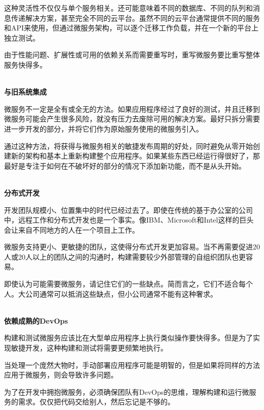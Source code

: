 这种灵活性不仅仅与单个服务相关。还可能意味着不同的数据库、不同的队列和消息传递解决方案，甚至完全不同的云平台。虽然不同的云平台通常提供不同的服务和API来使用，但通过微服务架构，可以逐个迁移工作负载，并在一个新的平台上独立测试。

由于性能问题、扩展性或可用的依赖关系而需要重写时，重写微服务要比重写整体服务快得多。

\hspace*{\fill} \\ %
\noindent
\textbf{与旧系统集成}

微服务不一定是全有或全无的方法。如果应用程序经过了良好的测试，并且迁移到微服务可能会产生很多风险，就没有压力去废除可用的解决方案。最好只拆分需要进一步开发的部分，并将它们作为原始服务使用的微服务引入。

通过这种方法，将获得与微服务相关的敏捷发布周期的好处，同时避免从零开始创建新的架构和基本上重新构建整个应用程序。如果某些东西已经运行得很好了，那最好是专注于如何在不破坏好的部分的情况下添加新功能，而不是从头开始。

\hspace*{\fill} \\ %
\noindent
\textbf{分布式开发}

开发团队规模小、位置集中的时代已经过去了。即使在传统的基于办公室的公司中，远程工作和分布式开发也是一个事实。像IBM、Microsoft和Intel这样的巨头会让来自不同地方的人在一个项目上工作。

微服务支持更小、更敏捷的团队，这使得分布式开发更加容易。当不再需要促进20人或20人以上的团队之间的沟通时，构建需要较少外部管理的自组织团队也更容易。


即使认为可能需要微服务，请记住它们的一些缺点。简而言之，它们不适合每个人。大公司通常可以抵消这些缺点，但小公司通常不能有这种奢求。

\hspace*{\fill} \\ %
\noindent
\textbf{依赖成熟的DevOps}

构建和测试微服务应该比在大型单应用程序上执行类似操作要快得多。但是为了实现敏捷开发，这种构建和测试将需要更频繁地执行。 

当处理一个庞然大物时，手动部署应用程序可能是明智的，但是如果将同样的方法应用于微服务，则会导致许多问题。

为了在开发中拥抱微服务，必须确保团队有DevOps的思维，理解构建和运行微服务的需求。仅仅把代码交给别人，然后忘记是不够的。

